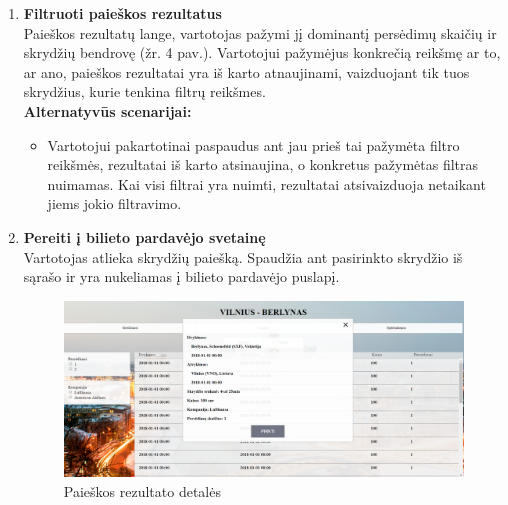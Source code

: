 \documentclass{VUMIFPSkursinis}
\begin{document}
\begin{enumerate}[label=\textbf{U\arabic*}.]
                    \item \textbf{Filtruoti paieškos rezultatus}\\
                    Paieškos rezultatų lange, vartotojas pažymi jį dominantį persėdimų skaičių ir skrydžių bendrovę (žr. 4 pav.). Vartotojui pažymėjus konkrečią reikšmę ar to, ar ano, paieškos rezultatai yra iš karto atnaujinami, vaizduojant tik tuos skrydžius, kurie tenkina filtrų reikšmes.
                    \\\textbf{Alternatyvūs scenarijai:}
                    \begin{itemize}
                        \item Vartotojui pakartotinai paspaudus ant jau prieš tai pažymėta filtro reikšmės, rezultatai iš karto atsinaujina, o konkretus pažymėtas filtras nuimamas. Kai visi filtrai yra nuimti, rezultatai atsivaizduoja netaikant jiems jokio filtravimo.
                    \end{itemize}

                    \item \textbf{Pereiti į bilieto pardavėjo svetainę}\\
                    Vartotojas atlieka skrydžių paiešką. Spaudžia ant pasirinkto skrydžio iš sąrašo ir yra nukeliamas į bilieto pardavėjo puslapį.
                    \begin{figure}[H]
                        \centering
                        \includegraphics[scale=0.4]{img/buy}
                        \caption{Paieškos rezultato detalės}
                        \label{Paieškos rezultato detalės}
                    \end{figure}


\end{enumerate}
\end{document}
